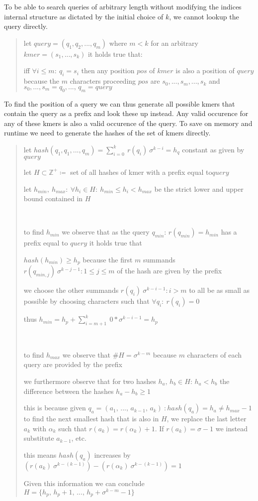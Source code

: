 To be able to search queries of arbitrary length without modifying the indices internal structure as dictated by the
initial choice of $k$, we cannot lookup the query directly.

\begin{verse}
let $query=(q_{1},q_{2},...,q_{m})$ where $m<k$ \newline
for an arbitrary $kmer=(s_{1},...,s_{k})$ it holds true that:

iff $\forall i\leq m:\:q_{i}=s_{i}$ then any position $pos$ of $kmer$
is also a position of $query$
because the $m$ characters proceeding $pos$ are
$s_{0},...,s_{m},...,s_{k}$ and $s_{0},...,s_{m}=q_{0},...,\,q_{m}=query$
\end{verse}

To find the position of a query we can thus generate all possible kmers that contain the query as a prefix and look
these up instead. Any valid occurence for any of these kmers is also a valid occurence of the query.
To save on memory and runtime we need to generate the hashes of the set of kmers directly.

\begin{verse}
let $hash(q_{1},q_{1},...,q_{m})=\sum_{i=0}^{k}\:r(q_{i})\:\sigma^{k-i}=h_{q}$
constant as given by $query$

let $H\subset\mathbb{Z}^{+}\coloneqq$ set of all hashes of kmer with
a prefix equal to$query$

let $h_{min},\:h_{max}:\:\forall h_{i}\in H:\:h_{min}\leq h_{i}<h_{max}$
be the strict lower and upper bound contained in $H$

~

to find $h_{min}$ we observe that as the query $q_{min}:\,r(q_{min})=h_{min}$
has a prefix equal to $query$ it holds true that

$hash(h_{min})\geq h_{p}$ because the first $m$ summands $r(q_{min,j})\:\sigma^{k-j-1}:1\leq j\leq m$
of the hash are given by the prefix

we choose the other summands $r(q_{i})\:\sigma^{k-i-1}:i>m$ to all
be as small as possible by choosing characters such that $\forall q_{i}:\:r(q_{i})=0$

thus $h_{min}=h_{p}+\sum_{i=m+1}^{k}\:0*\sigma^{k-i-1}=h_{p}$

~

to find $h_{max}$ we observe that $\#H=\sigma^{k-m}$ because $m$ characters
of each query are provided by the prefix

we furthermore observe that for two hashes $h_{a},\,h_{b}\in H:\,h_{a}<h_{b}$ the
difference between the hashes $h_{a}-h_{b}\geq1$

this is because given $q_{a}=(a_{1},\,...,\,a_{k-1},\,a_{k})\::hash(q_{a})=h_{a}\neq h_{max}-1$
to find the next smallest hash that is also in $H$, we replace the
last letter $a_{k}$ with $\alpha_{k}$ such that $r(a_{k})=r(\alpha_{k})+1$.
If $r(a_{k})=\sigma-1$ we instead substitute $a_{k-1}$, etc.

this means $hash(q_{a})$ increases by $(r(a_{k})\:\sigma^{k-(k-1)})-(r(\alpha_{k})\:\sigma^{k-(k-1)})=1$

Given this information we can conclude $H=\{h_{p},\,h_{p}+1,\,...,\,h_{p}+\sigma^{k-m}-1\}$
\end{verse}

